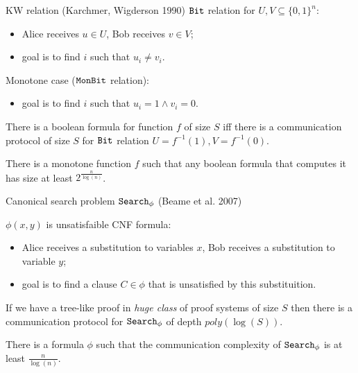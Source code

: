 \begin{frame}{KW relation (Karchmer, Wigderson 1990)}
    $\mathtt{Bit}$ relation for $U, V \subseteq \{0, 1\}^{n}$:
    \begin{itemize}
        \item Alice receives $u \in U$, Bob receives $v \in V$;
        \item goal is to find $i$ such that $u_i \neq v_i$.
    \end{itemize}
    \pause
    Monotone case ($\mathtt{MonBit}$ relation):
    \begin{itemize}
        \item goal is to find $i$ such that $u_i = 1 \land v_i = 0$.
    \end{itemize}

    \pause

    \begin{theorem}
        There is a  boolean formula for function $f$ of size $S$ iff there is a communication
        protocol of size $S$ for $\mathtt{Bit}$  relation $U = f^{-1}(1), V = f^{-1}(0)$.
    \end{theorem}

    \pause
    \pause
    
    \begin{theorem}[Pitassi, G{\"{o}}{\"{o}}s, 2014]
        There is a monotone function $f$ such that any boolean formula that computes it has size at least
        $2^{\frac{n}{\log(n)}}$. 
    \end{theorem}
\end{frame}

\begin{frame}{Canonical search problem $\mathtt{Search}_{\phi}$ (Beame et al. 2007)}
    
    $\phi(x, y)$ is unsatisfaible CNF formula:
    \begin{itemize}
        \item Alice receives a substitution to variables $x$, Bob receives a substitution to variable $y$;
        \item goal is to find a clause $C \in \phi$ that is unsatisfied by this substituition.
    \end{itemize}

    \pause

    \begin{theorem}
        If we have a tree-like proof in \textit{huge class} of proof systems of size $S$ then there is a communication
        protocol for $\mathtt{Search}_{\phi}$ of depth $poly(\log(S))$.
    \end{theorem}

    \pause
    
    \begin{theorem}[Pitassi, G{\"{o}}{\"{o}}s, 2014]
        There is a formula $\phi$ such that the communication complexity of $\mathtt{Search}_{\phi}$ is at least $\frac{n}{\log(n)}$.
    \end{theorem}
\end{frame}

